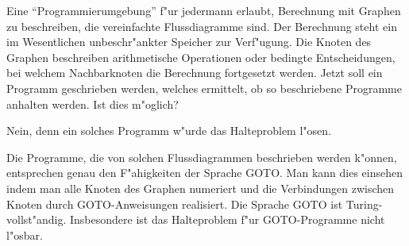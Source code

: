 Eine ``Programmierumgebung'' f"ur jedermann erlaubt, Berechnung mit
Graphen zu beschreiben, die vereinfachte Flussdiagramme sind.
Der Berechnung steht ein im Wesentlichen unbeschr"ankter Speicher
zur Verf"ugung.
Die Knoten des Graphen beschreiben arithmetische Operationen
oder bedingte Entscheidungen, bei welchem Nachbarknoten die
Berechnung fortgesetzt werden.
Jetzt soll ein Programm geschrieben werden, welches ermittelt,
ob so beschriebene Programme anhalten werden.
Ist dies m"oglich?

\begin{loesung}
Nein, denn ein solches Programm  w"urde das Halteproblem l"osen.

Die Programme, die von solchen Flussdiagrammen beschrieben werden
k"onnen, entsprechen genau den F"ahigkeiten der Sprache GOTO.
Man kann dies einsehen indem man alle Knoten des Graphen numeriert und
die Verbindungen zwischen Knoten durch GOTO-Anweisungen realisiert.
Die Sprache GOTO ist Turing-vollst"andig.
Insbesondere ist das Halteproblem f"ur GOTO-Programme nicht l"osbar.
\end{loesung}

\begin{bewertung}
\end{bewertung}




